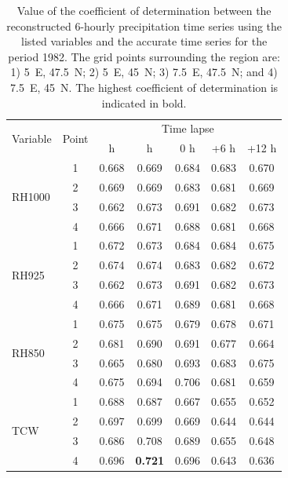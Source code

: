 \documentclass[hess, manuscript]{copernicus}
\begin{document}
	\begin{table}[htb]
		\caption{Value of the coefficient of determination between the reconstructed 6-hourly precipitation time series using the listed variables and the accurate time series for the period 1982. The grid points surrounding the region are: 1) 5\textdegree\ E, 47.5\textdegree\ N; 2) 5\textdegree\ E, 45\textdegree\ N; 3) 7.5\textdegree\ E, 47.5\textdegree\ N; and 4) 7.5\textdegree\ E, 45\textdegree\ N. The highest coefficient of determination is indicated in bold.}
		\begin{center}
			\begin{tabular}{l c c c c c c}
				\hline
				\multirow{2}{*}{Variable} & \multirow{2}{*}{Point} &  \multicolumn{5}{c}{Time lapse} \\
				&  & \textendash 12 h & \textendash 6 h & 0 h & +6 h & +12 h \\ 
				\hline
				\multirow{ 4}{*}{RH1000} & 1 & 0.668 & 0.669 & 0.684 & 0.683 & 0.670 \\
				& 2 & 0.669 & 0.669 & 0.683 & 0.681 & 0.669 \\
				& 3 & 0.662 & 0.673 & 0.691 & 0.682 & 0.673 \\
				& 4 & 0.666 & 0.671 & 0.688 & 0.681 & 0.668 \\ \hline
				\multirow{ 4}{*}{RH925} & 1 & 0.672 & 0.673 & 0.684 & 0.684 & 0.675 \\
				& 2 & 0.674 & 0.674 & 0.683 & 0.682 & 0.672 \\
				& 3 & 0.662 & 0.673 & 0.691 & 0.682 & 0.673 \\
				& 4 & 0.666 & 0.671 & 0.689 & 0.681 & 0.668 \\ \hline
				\multirow{ 4}{*}{RH850} & 1 & 0.675 & 0.675 & 0.679 & 0.678 & 0.671 \\
				& 2 & 0.681 & 0.690 & 0.691 & 0.677 & 0.664 \\
				& 3 & 0.665 & 0.680 & 0.693 & 0.683 & 0.675 \\
				& 4 & 0.675 & 0.694 & 0.706 & 0.681 & 0.659 \\ \hline
				\multirow{ 4}{*}{TCW} & 1 & 0.688 & 0.687 & 0.667 & 0.655 & 0.652 \\
				& 2 & 0.697 & 0.699 & 0.669 & 0.644 & 0.644 \\
				& 3 & 0.686 & 0.708 & 0.689 & 0.655 & 0.648 \\
				& 4 & 0.696 & \textbf{0.721} & 0.696 & 0.643 & 0.636 \\ \hline
			\end{tabular}
		\end{center}
		\label{table:proxy_correlations}
	\end{table}
	
\end{document}
